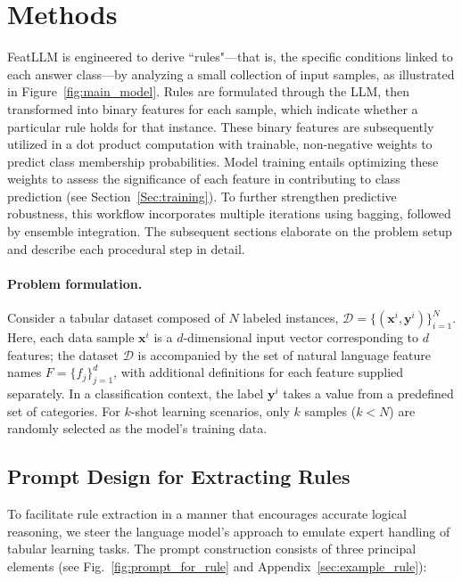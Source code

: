 \section{Methods}
\textsf{FeatLLM} is engineered to derive ``rules"—that is, the specific conditions linked to each answer class—by analyzing a small collection of input samples, as illustrated in Figure~\ref{fig:main_model}. Rules are formulated through the LLM, then transformed into binary features for each sample, which indicate whether a particular rule holds for that instance. These binary features are subsequently utilized in a dot product computation with trainable, non-negative weights to predict class membership probabilities. Model training entails optimizing these weights to assess the significance of each feature in contributing to class prediction (see Section~\ref{Sec:training}). To further strengthen predictive robustness, this workflow incorporates multiple iterations using bagging, followed by ensemble integration. The subsequent sections elaborate on the problem setup and describe each procedural step in detail.

\vspace*{-0.12in}
\paragraph{Problem formulation.} Consider a tabular dataset composed of $N$ labeled instances, $\mathcal{D} = \{(\mathbf{x}^i, \mathbf{y}^i)\}_{i=1}^{N}$. Here, each data sample $\mathbf{x}^i$ is a $d$-dimensional input vector corresponding to $d$ features; the dataset $\mathcal{D}$ is accompanied by the set of natural language feature names $F = \{f_j\}_{j=1}^{d}$, with additional definitions for each feature supplied separately. In a classification context, the label $\mathbf{y}^i$ takes a value from a predefined set of categories. For $k$-shot learning scenarios, only $k$ samples ($k < N$) are randomly selected as the model's training data.

\subsection{Prompt Design for Extracting Rules}
\label{Sec:prompt_design}
To facilitate rule extraction in a manner that encourages accurate logical reasoning, we steer the language model’s approach to emulate expert handling of tabular learning tasks. The prompt construction consists of three principal elements (see Fig.~\ref{fig:prompt_for_rule} and Appendix~\ref{sec:example_rule}):

